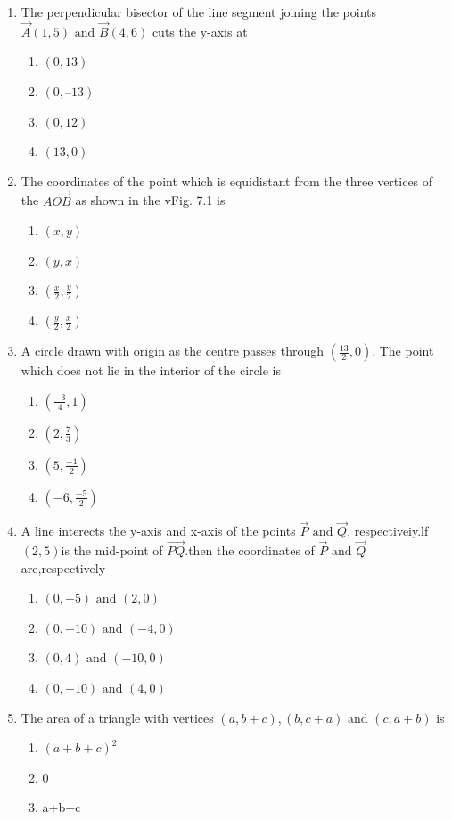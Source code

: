 \begin{enumerate}[label=\thesection.\arabic*,ref=\thesection.\theenumi]
\item The perpendicular bisector of the line segment joining the points $\vec{A} (1, 5) \text{ and }
\vec{B} (4, 6)$ cuts the y-axis at
\begin{enumerate}
	\item$(0, 13)$ 
	\item $(0, –13)$
	\item$(0, 12) $
	\item$(13, 0)$
\end{enumerate}
\item The coordinates of the point which
	is equidistant from the three vertices of the  $\vec{AOB}$ as shown in the
vFig. 7.1 is
\begin{enumerate}
	\item $(x, y)$
	\item $(y, x)$
	\item $(\frac{x}{2},\frac{y}{2})$
\item $(\frac{y}{2},\frac{x}{2})$
\end{enumerate}
\item A circle drawn with origin as the
centre passes through 
$(\frac{13}{2},0)$. The
point which does not lie in the
interior of the circle is
\begin{enumerate}
\item $(\frac{-3}{4},1)$
\item $(2,\frac{7}{3})$
\item $(5,\frac{-1}{2})$
\item $(-6,\frac{-5}{2})$
\end{enumerate}
\item A line interects the y-axis and x-axis of the points $\vec{P} \text{ and }\vec{Q}$, respectiveiy.lf $(2,5)$is the mid-point of $\vec{PQ}$.then the coordinates of $\vec{P} \text{ and } \vec{Q}$ are,respectively
\begin{enumerate}
	\item$(0,-5)\text{ and }(2,0)$
	\item$(0,-10)\text{ and }(-4,0)$
	\item$(0,4)\text{ and } (-10,0)$
	\item$(0,-10)\text{ and }(4,0)$
\end{enumerate}
\item The area of a triangle with vertices $(a,b+c), (b,c+a)\text{ and }(c,a+b)$ is
\begin{enumerate}
\item $(a+b+c)^2$
\item 0
\item a+b+c

\end{enumerate}
\end{enumerate}
